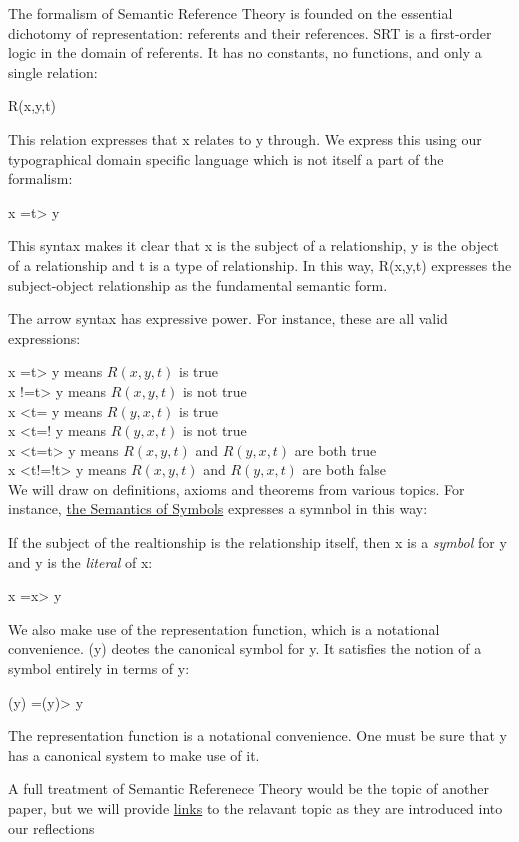 \documentclass[runningheads]{llncs}
\begin{document}
The formalism of Semantic Reference Theory is founded on the essential dichotomy of representation: referents and their references. SRT is a first-order logic in the domain of referents. It has no constants, no functions, and only a single relation: 

R(x,y,t)

This relation expresses that x relates to y through. We express this using our typographical domain specific language which is not itself a part of the formalism:

x =t> y

This syntax makes it clear that x is the subject of a relationship, y is the object of a relationship and t is a type of relationship. In this way, R(x,y,t) expresses the subject-object relationship as the fundamental semantic form.  

The arrow syntax has expressive power. For instance, these are all valid expressions:

x =t> y means $R(x,y,t)$ is true \\
x !=t> y means $R(x,y,t)$ is not true \\
x <t= y means $R(y,x,t)$ is true \\
x <t=! y means $R(y,x,t)$ is not true \\
x <t=t> y means $R(x,y,t)$ and $R(y,x,t)$ are both true \\
x <t!=!t> y means $R(x,y,t)$ and $R(y,x,t)$ are both false \\

We will draw on definitions, axioms and theorems from various topics. For instance, \href{https://github.com/DNA-Platform/inexplicable-phenomena/formalism/semantic-reference-theory/symbols.pdf}{the Semantics of Symbols} expresses a symnbol in this way:

If the subject of the realtionship is the relationship itself, then x is a \emph{symbol} for y and y is the \emph{literal} of x:

x =x> y

We also make use of the representation function, which is a notational convenience. (y) deotes the canonical symbol for y. It satisfies the notion of a symbol entirely in terms of y:

(y) =(y)> y

The representation function is a notational convenience. One must be sure that y has a canonical system to make use of it.

A full treatment of Semantic Referenece Theory would be the topic of another paper, but we will provide \href{https://github.com/DNA-Platform/inexplicable-phenomena/formalism/semantic-reference-theory/introduction.pdf}{links} to the relavant topic as they are introduced into our reflections
\end{document}
